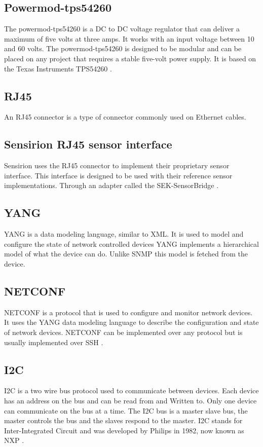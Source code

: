 \documentclass[12pt]{article}
\begin{document}
\subsection{Powermod-tps54260}
The powermod-tps54260 is a DC to DC voltage regulator that can deliver a maximum of five volts at three amps.
It works with an input voltage between 10 and 60 volts. The powermod-tps54260 is designed to be modular and
can be placed on any project that requires a stable five-volt power supply. It is based on the Texas Instruments TPS54260 \cite{TPS54260DataSheet}.

\subsection{RJ45}
An RJ45 connector is a type of connector commonly used on Ethernet cables.

\subsection{Sensirion RJ45 sensor interface}
Sensirion uses the RJ45 connector to implement their proprietary sensor interface.
This interface is designed to be used with their reference sensor implementations. Through 
an adapter called the SEK-SensorBridge \cite{agSEKSensorBridgeConnectingBridgeTwo}.

\subsection{YANG}
YANG is a data modeling language, similar to XML. It is used to model and configure the state of network controlled devices \cite{bjorklundYANG11Data2016}
YANG implements a hierarchical model of what the device can do. Unlike SNMP this model is fetched from the device.

\subsection{NETCONF}
NETCONF is a protocol that is used to configure and monitor network devices. It uses the YANG data modeling language to describe the configuration and state of network devices.
NETCONF can be implemented over any protocol but is usually implemented over SSH \cite{ennsNetworkConfigurationProtocol2011}.

\subsection{I2C}
I2C is a two wire bus protocol used to communicate between devices. Each device has an address on the bus and can be read from and Written to.
Only one device can communicate on the bus at a time. The I2C bus is a master slave bus, the master controls the bus and the slaves respond to the master.
I2C stands for Inter-Integrated Circuit and was developed by Philips in 1982, now known as NXP \cite{I2CbusSpecificationUser2021}.
\end{document}
